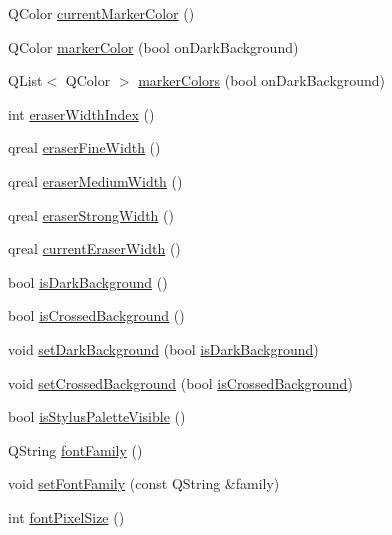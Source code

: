 \begin{DoxyCompactItemize}
\item 
Q\-Color \hyperlink{class_u_b_settings_affdc42a5394182b71057c49f370b8a41}{current\-Marker\-Color} ()
\item 
Q\-Color \hyperlink{class_u_b_settings_a500571c8d157287ae6135eed3651159e}{marker\-Color} (bool on\-Dark\-Background)
\item 
Q\-List$<$ Q\-Color $>$ \hyperlink{class_u_b_settings_a3796f6c804d5079753f29d253facee99}{marker\-Colors} (bool on\-Dark\-Background)
\item 
int \hyperlink{class_u_b_settings_ada05e29c99278807b42b57371908f18e}{eraser\-Width\-Index} ()
\item 
qreal \hyperlink{class_u_b_settings_abbf9347670180575e66cefd66701f92a}{eraser\-Fine\-Width} ()
\item 
qreal \hyperlink{class_u_b_settings_aa0c52e805f232f31a73839a3ae2bcdfb}{eraser\-Medium\-Width} ()
\item 
qreal \hyperlink{class_u_b_settings_a0eee7b82a8544dfa8efd22a958a33132}{eraser\-Strong\-Width} ()
\item 
qreal \hyperlink{class_u_b_settings_a38ea059d4439f9beea68dfe9879e9970}{current\-Eraser\-Width} ()
\item 
bool \hyperlink{class_u_b_settings_a57270646688a0214f4fc2c8d2f31d7a6}{is\-Dark\-Background} ()
\item 
bool \hyperlink{class_u_b_settings_a72b8921582b808d3803c663ab43a1bf9}{is\-Crossed\-Background} ()
\item 
void \hyperlink{class_u_b_settings_a21b76b3ef36e0c99536082f86fa317ad}{set\-Dark\-Background} (bool \hyperlink{class_u_b_settings_a57270646688a0214f4fc2c8d2f31d7a6}{is\-Dark\-Background})
\item 
void \hyperlink{class_u_b_settings_a50e2d1a724bdea8504e501215cea9d67}{set\-Crossed\-Background} (bool \hyperlink{class_u_b_settings_a72b8921582b808d3803c663ab43a1bf9}{is\-Crossed\-Background})
\item 
bool \hyperlink{class_u_b_settings_a8752761867214ad017735f1869e03258}{is\-Stylus\-Palette\-Visible} ()
\item 
Q\-String \hyperlink{class_u_b_settings_aff04ceea46fd5131313d443c361ed870}{font\-Family} ()
\item 
void \hyperlink{class_u_b_settings_af86c98d215ecddd64f90fe92e9fdd529}{set\-Font\-Family} (const Q\-String \&family)
\item 
int \hyperlink{class_u_b_settings_aee6ffac311ea8bcc7322d0713c14fbd9}{font\-Pixel\-Size} ()
\item 

\end{DoxyCompactItemize}
